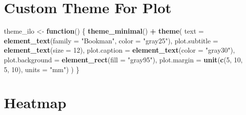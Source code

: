 \documentclass[]{book}
\newenvironment{Shaded}{\begin{snugshade}}{\end{snugshade}}
\newcommand{\ControlFlowTok}[1]{\textcolor[rgb]{0.13,0.29,0.53}{\textbf{#1}}}
\newcommand{\DataTypeTok}[1]{\textcolor[rgb]{0.13,0.29,0.53}{#1}}
\newcommand{\DecValTok}[1]{\textcolor[rgb]{0.00,0.00,0.81}{#1}}
\newcommand{\KeywordTok}[1]{\textcolor[rgb]{0.13,0.29,0.53}{\textbf{#1}}}
\newcommand{\NormalTok}[1]{#1}
\newcommand{\OperatorTok}[1]{\textcolor[rgb]{0.81,0.36,0.00}{\textbf{#1}}}
\newcommand{\OtherTok}[1]{\textcolor[rgb]{0.56,0.35,0.01}{#1}}
\newcommand{\StringTok}[1]{\textcolor[rgb]{0.31,0.60,0.02}{#1}}
\begin{document}
\hypertarget{custom-theme-for-plot}{%
\section{Custom Theme For Plot}\label{custom-theme-for-plot}}

\begin{Shaded}
\begin{Highlighting}[]
\NormalTok{theme_ilo <-}\StringTok{ }\ControlFlowTok{function}\NormalTok{() \{}
    \KeywordTok{theme_minimal}\NormalTok{() }\OperatorTok{+}
\StringTok{        }\KeywordTok{theme}\NormalTok{(}
            \DataTypeTok{text =} \KeywordTok{element_text}\NormalTok{(}\DataTypeTok{family =} \StringTok{"Bookman"}\NormalTok{, }\DataTypeTok{color =} \StringTok{"gray25"}\NormalTok{),}
            \DataTypeTok{plot.subtitle =} \KeywordTok{element_text}\NormalTok{(}\DataTypeTok{size =} \DecValTok{12}\NormalTok{),}
            \DataTypeTok{plot.caption =} \KeywordTok{element_text}\NormalTok{(}\DataTypeTok{color =} \StringTok{"gray30"}\NormalTok{),}
            \DataTypeTok{plot.background =} \KeywordTok{element_rect}\NormalTok{(}\DataTypeTok{fill =} \StringTok{"gray95"}\NormalTok{),}
            \DataTypeTok{plot.margin =} \KeywordTok{unit}\NormalTok{(}\KeywordTok{c}\NormalTok{(}\DecValTok{5}\NormalTok{, }\DecValTok{10}\NormalTok{, }\DecValTok{5}\NormalTok{, }\DecValTok{10}\NormalTok{), }\DataTypeTok{units =} \StringTok{"mm"}\NormalTok{)}
\NormalTok{        )}
\NormalTok{\}}
\end{Highlighting}
\end{Shaded}

\hypertarget{heatmap}{%
\section{Heatmap}\label{heatmap}}

\begin{Shaded}
\end{Shaded}
\end{document}
